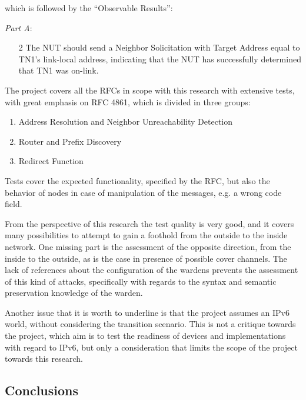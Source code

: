 \documentclass[12pt]{article}
\begin{document}
which is followed by the ``Observable Results'':

\textit{Part A}:
\vspace{-15pt}
\begin{enumerate}[noitemsep,topsep=0pt,partopsep=0pt]
 \item[2] The NUT should send a Neighbor Solicitation with Target Address equal to TN1’s link-local address, indicating that the NUT has successfully determined that TN1 was on-link.
\end{enumerate}


The project covers all the RFCs in scope with this research with extensive tests, with great emphasis on RFC 4861, which is divided in three groups:
\vspace{-15pt}
\begin{enumerate}[noitemsep,topsep=0pt,partopsep=0pt]
 \item Address Resolution and Neighbor Unreachability Detection
 \item Router and Prefix Discovery
 \item Redirect Function
\end{enumerate}

Tests cover the expected functionality, specified by the RFC, but also the behavior of nodes in case of manipulation of the messages, e.g. a wrong code field.

From the perspective of this research the test quality is very good, and it covers many possibilities to attempt to gain a foothold from the outside to the inside network. One missing part is the assessment of the opposite direction, from the inside to the outside, as is the case in presence of possible cover channels. The lack of references about the configuration of the wardens prevents the assessment of this kind of attacks, specifically with regards to the syntax and semantic preservation knowledge of the warden.

Another issue that it is worth to underline is that the project assumes an IPv6 world, without considering the transition scenario. This is not a critique towards the project, which aim is to test the readiness of devices and implementations with regard to IPv6, but only a consideration that limits the scope of the project towards this research.


\subsection{Conclusions}
\end{document}

